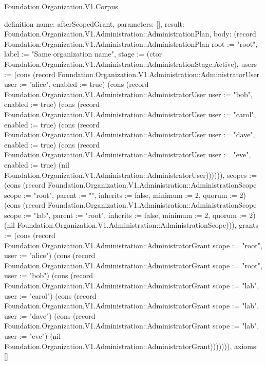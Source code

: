 \begin{lexlean}{Foundation.Organization.V1.Corpus}
\begin{semanticmodule}
definition{
  name: afterScopedGrant,
  parameters: [],
  result: Foundation.Organization.V1.Administration::AdministrationPlan,
  body: (record Foundation.Organization.V1.Administration::AdministrationPlan {root := "root", label := "Same organization name", stage := (ctor Foundation.Organization.V1.Administration::AdministrationStage.Active), users := (cons (record Foundation.Organization.V1.Administration::AdministratorUser {user := "alice", enabled := true}) (cons (record Foundation.Organization.V1.Administration::AdministratorUser {user := "bob", enabled := true}) (cons (record Foundation.Organization.V1.Administration::AdministratorUser {user := "carol", enabled := true}) (cons (record Foundation.Organization.V1.Administration::AdministratorUser {user := "dave", enabled := true}) (cons (record Foundation.Organization.V1.Administration::AdministratorUser {user := "eve", enabled := true}) (nil Foundation.Organization.V1.Administration::AdministratorUser)))))), scopes := (cons (record Foundation.Organization.V1.Administration::AdministrationScope {scope := "root", parent := "", inherits := false, minimum := 2, quorum := 2}) (cons (record Foundation.Organization.V1.Administration::AdministrationScope {scope := "lab", parent := "root", inherits := false, minimum := 2, quorum := 2}) (nil Foundation.Organization.V1.Administration::AdministrationScope))), grants := (cons (record Foundation.Organization.V1.Administration::AdministratorGrant {scope := "root", user := "alice"}) (cons (record Foundation.Organization.V1.Administration::AdministratorGrant {scope := "root", user := "bob"}) (cons (record Foundation.Organization.V1.Administration::AdministratorGrant {scope := "lab", user := "carol"}) (cons (record Foundation.Organization.V1.Administration::AdministratorGrant {scope := "lab", user := "dave"}) (cons (record Foundation.Organization.V1.Administration::AdministratorGrant {scope := "lab", user := "eve"}) (nil Foundation.Organization.V1.Administration::AdministratorGrant))))))}),
  axioms: []
}


\end{semanticmodule}
\end{lexlean}

